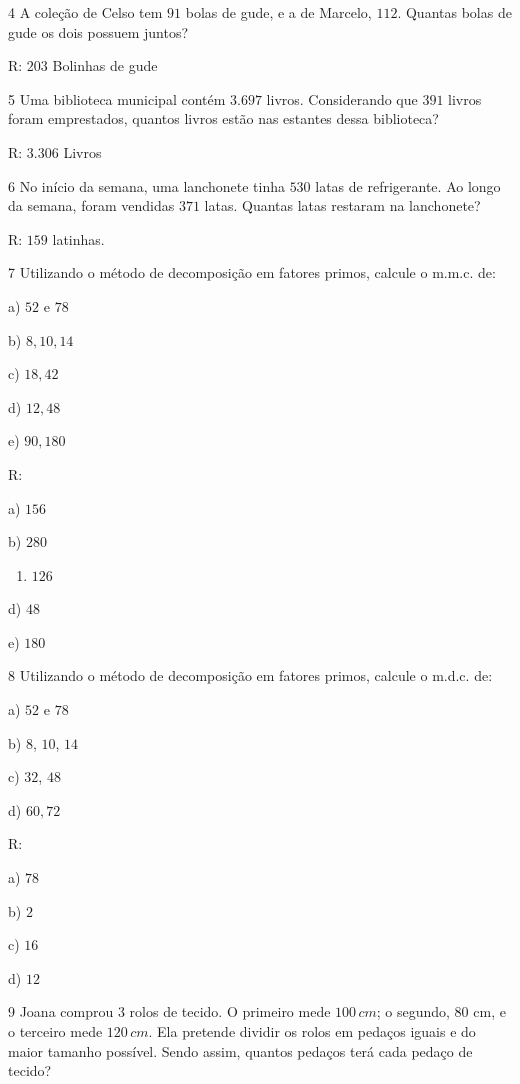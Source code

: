 \num{4}  A coleção de Celso tem $91$ bolas de gude, e a de Marcelo, $112$. Quantas
bolas de gude os dois possuem juntos?


R: $203$ Bolinhas de gude

\num{5}  Uma biblioteca municipal contém $3.697$ livros. Considerando que $391$
livros foram emprestados, quantos livros estão nas estantes dessa
biblioteca?

R: $3.306$ Livros

\num{6}  No início da semana, uma lanchonete tinha $530$ latas de refrigerante.
Ao longo da semana, foram vendidas $371$ latas. Quantas latas restaram na
lanchonete?

R: $159$ latinhas.

\num{7}  Utilizando o método de decomposição em fatores primos, calcule o
m.m.c. de:

a) $52$ e $78$

b) $8,10,14$

c) $18,42$

d) $12,48$

e) $90,180$

R:

a) $156$

b) $280$

\begin{enumerate}
\def\labelenumi{\alph{enumi})}
\setcounter{enumi}{2}
\tightlist
\item
  $126$
\end{enumerate}

d) $48$

e) $180$

\num{8}  Utilizando o método de decomposição em fatores primos, calcule o
m.d.c. de:

a) $52$ e $78$

b) $8$, $10$, $14$

c) $32$, $48$

d) $60,72$

R:

a) $78$

b) $2$

c) $16$

d) $12$

\num{9}  Joana comprou $3$ rolos de tecido. O primeiro mede $100\,cm$; o segundo,
80 cm, e o terceiro mede $120\,cm$. Ela pretende dividir os rolos em
pedaços iguais e do maior tamanho possível. Sendo assim, quantos pedaços
terá cada pedaço de tecido?

